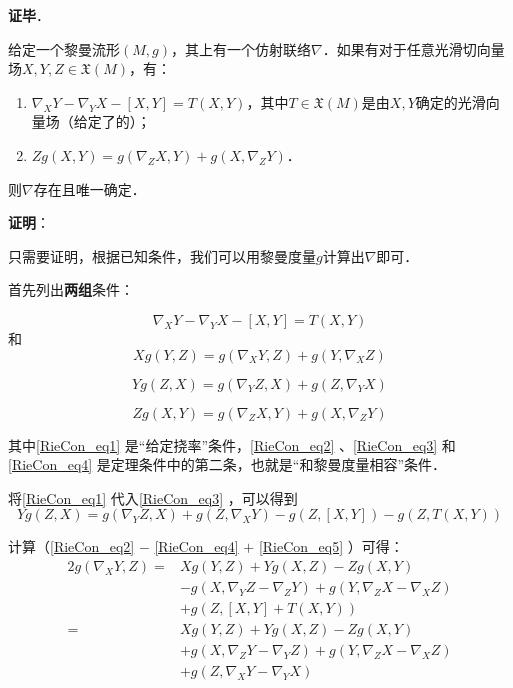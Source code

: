 \textbf{证毕}．






\begin{theorem}{}\label{RieCon_the1}
给定一个黎曼流形$(M, g)$，其上有一个仿射联络$\nabla$．如果有对于任意光滑切向量场$X, Y, Z\in\mathfrak{X}(M)$，有：
\begin{enumerate}
\item $\nabla_XY-\nabla_YX-[X, Y]=T(X, Y)$，其中$T\in \mathfrak{X}(M)$是由$X, Y$确定的光滑向量场（给定了的）；
\item $Zg(X, Y)=g(\nabla_ZX, Y)+g(X, \nabla_ZY)$．
\end{enumerate}
则$\nabla$存在且唯一确定．
\end{theorem}

\textbf{证明}：

只需要证明，根据已知条件，我们可以用黎曼度量$g$计算出$\nabla$即可．

首先列出\textbf{两组}条件：

\begin{equation}\label{RieCon_eq1}
\nabla_XY-\nabla_YX-[X, Y]=T(X, Y)
\end{equation}
和
\begin{equation}\label{RieCon_eq2}
Xg(Y, Z)=g(\nabla_XY, Z)+g(Y, \nabla_XZ)
\end{equation}

\begin{equation}\label{RieCon_eq3}
Yg(Z, X)=g(\nabla_YZ, X)+g(Z, \nabla_YX)
\end{equation}

\begin{equation}\label{RieCon_eq4}
Zg(X, Y)=g(\nabla_ZX, Y)+g(X, \nabla_ZY)
\end{equation}


其中\autoref{RieCon_eq1} 是“给定挠率”条件，\autoref{RieCon_eq2} 、\autoref{RieCon_eq3} 和\autoref{RieCon_eq4} 是定理条件中的第二条，也就是“和黎曼度量相容”条件．

将\autoref{RieCon_eq1} 代入\autoref{RieCon_eq3} ，可以得到
\begin{equation}\label{RieCon_eq5}
Yg(Z, X)=g(\nabla_YZ, X)+g(Z, \nabla_XY)-g(Z, [X, Y])-g(Z, T(X, Y))
\end{equation}

计算（\autoref{RieCon_eq2} $-$ \autoref{RieCon_eq4} $+$ \autoref{RieCon_eq5} ）可得：
\begin{equation}\label{RieCon_eq6}
\begin{aligned}
2g(\nabla_XY, Z)=&Xg(Y, Z)+Yg(X, Z)-Zg(X, Y)\\&-g(X, \nabla_YZ-\nabla_ZY)+g(Y, \nabla_ZX-\nabla_XZ)\\&+g(Z, [X, Y]+T(X, Y))\\
=&Xg(Y, Z)+Yg(X, Z)-Zg(X, Y)\\&+g(X, \nabla_ZY-\nabla_YZ)+g(Y, \nabla_ZX-\nabla_XZ)\\&+g(Z, \nabla_XY-\nabla_YX)
\end{aligned}
\end{equation}

